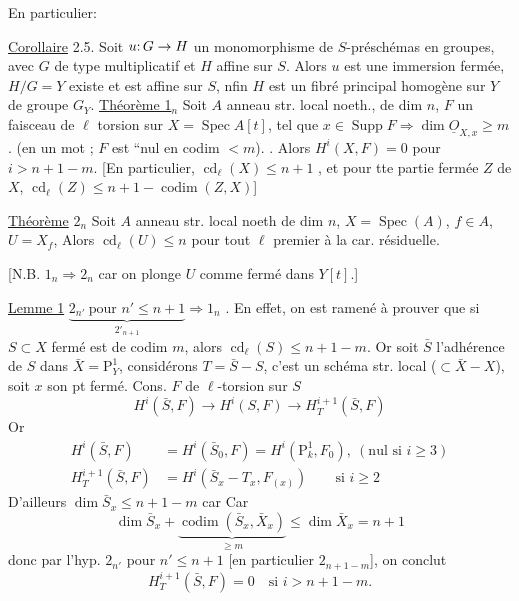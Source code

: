 En particulier:

\uline{Corollaire} 2.5. Soit $u\mathpunct{:}G\to H$ un monomorphisme de $S$-préschémas en groupes, avec $G$ de type multiplicatif et $H$ affine sur $S$. Alors $u$ est une
immersion fermée,  $H/G=Y$ existe et est affine sur $S$, nfin $H$ est un
fibré principal homogène sur $Y$ de groupe $G_Y$.
\uline{Théorème 1}$_n$ Soit $A$ anneau str. local noeth., de dim $n$, 
  $F$ un faisceau de $\ell$ torsion sur
$X=\operatorname{Spec} A[t]$,  tel que $x\in\operatorname{Supp} F\Longrightarrow\dim\underline O_{X,x}\geq m$.
(en un mot ; $F$ est ``nul en codim $<m$). .
Alors $H^i(X,F)=0$ pour $i>n+1-m$.
[En particulier, $\operatorname{cd}_{\ell}(X)\leq n+1$\deleted{\unsure{]}} , et pour tte partie fermée $Z$
de $X$,  $\operatorname{cd}_{\ell}(Z)\leq n+1-\operatorname{codim}(Z,X)$]

\uline{Théorème} $2_n$ Soit $A$ anneau str. local noeth de
dim $n$,  $X=\operatorname{Spec}(A)$, $f\in A$, $U=X_f$, Alors
$\operatorname{cd}_{\ell}(U)\leq n$ pour tout $\ell$ premier à la car. résiduelle.

[N.B. $1_n\Rightarrow2_n$ car on plonge $U$ comme fermé  dans $Y[t]$.]

\uline{Lemme 1} $\underbrace{2_{n'}\ \text{pour }n'\leq n+1}_{2'_{n+1}}\Longrightarrow 1_n$
. En effet, on est ramené à
prouver que si $S\subset X$ fermé est de codim $m$,
alors $\operatorname{cd}_{\ell}(S)\leq n+1-m$.  Or soit $\bar S$ l'adhérence de
$S$ dans $\bar X=\mathrm P^1_Y$, considérons $T=\bar S-S$, c'est un
schéma str. local ($\subset\bar X-X$), soit $x$ son pt fermé.
Cons.   $F$ de $\ell$-torsion sur $S$
\[
H^i(\bar S,F)\longrightarrow H^i(S,F)\longrightarrow H_T^{i+1}(\bar S,F)
\]
Or
\[
\begin{aligned}
H^i(\bar S,F)&=H^i(\bar S_0,F)=H^i(\mathrm P^1_k,F_0),\ (\text{nul si }i\geq3)\\
H_T^{i+1}(\bar S,F)&=H^i(\bar S_x-T_x,F_{(x)})\qquad\text{si } i\geq2
\end{aligned}
\]
D'ailleurs $\dim\bar S_x\leq n+1-m$ car 
 Car 
\[
\dim\bar S_x+\underbrace{\operatorname{codim}(\bar S_x,\bar X_x)}_{\geq m}\leq\dim\bar X_x=n+1
\]
donc par l'hyp.  $2_{n'}$ pour $n'\leq n+1$
[en particulier $2_{n+1-m}$], on conclut
\[
H_T^{i+1}(\bar S,F)=0\quad\text{si }i>n+1-m.
\]

